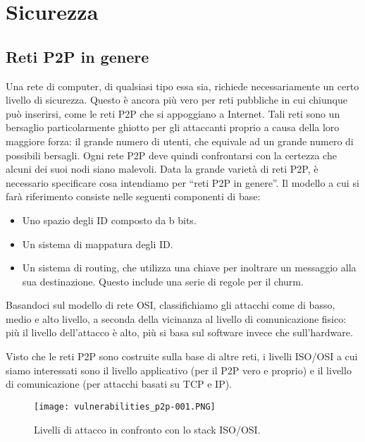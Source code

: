 \chapter{Sicurezza}\label{sicurezza}

\section{Reti P2P in genere}\label{reti-p2p-in-genere}

Una rete di computer, di qualsiasi tipo essa sia, richiede    necessariamente un certo livello di sicurezza. Questo è ancora più vero per reti pubbliche in cui chiunque può inserirsi, come le reti P2P che
si appoggiano a Internet.
Tali reti sono un bersaglio particolarmente ghiotto per gli attaccanti proprio a causa della loro maggiore forza: il grande numero di utenti,
che equivale ad un grande numero di possibili bersagli. Ogni rete P2P deve quindi confrontarsi con la certezza che alcuni dei suoi nodi siano
malevoli.  Data la grande varietà di reti P2P, è necessario specificare cosa intendiamo per ``reti P2P in genere''. Il modello \cite{vulnerabilities} a cui si farà riferimento consiste nelle seguenti componenti di base:

\begin{itemize}
\itemsep1pt\parskip0pt
\item
  Uno spazio degli ID composto da b bits.
\item
  Un sistema di mappatura degli ID.
\item
  Un sistema di routing, che utilizza una chiave per inoltrare un   messaggio alla sua destinazione. Questo include una serie di regole   per il churm.
\end{itemize}


Basandoci sul modello di rete OSI, classifichiamo gli attacchi come di basso, medio e alto livello, a seconda della vicinanza al livello di comunicazione fisico: più il livello dell'attacco è alto, più si basa sul software invece che sull'hardware.

Visto che le reti P2P sono costruite sulla base di altre reti, i livelli ISO/OSI a cui siamo interessati sono il livello applicativo (per il P2P vero e proprio) e il livello di comunicazione (per attacchi basati su TCP e IP).

\begin{figure}[htbp]
\centering
\texttt{[image: vulnerabilities\_p2p-001.PNG]}
\caption{Livelli di attacco in confronto con lo stack ISO/OSI.\label{vulnerabilities_p2p-001}}
\end{figure}

